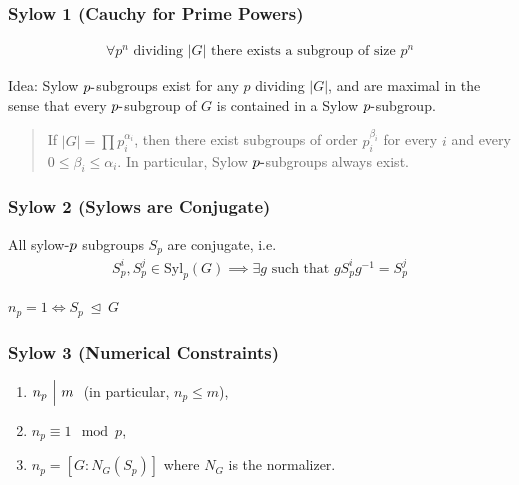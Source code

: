 \hypertarget{sylow-1-cauchy-for-prime-powers}{%
\subsubsection{Sylow 1 (Cauchy for Prime
Powers)}\label{sylow-1-cauchy-for-prime-powers}}

\begin{align*}
\forall p^n \text{ dividing } {\left\lvert {G} \right\rvert} \text{ there exists a subgroup of size } p^n
\end{align*}

Idea: Sylow \(p{\hbox{-}}\)subgroups exist for any \(p\) dividing
\({\left\lvert {G} \right\rvert}\), and are maximal in the sense that
every \(p{\hbox{-}}\)subgroup of \(G\) is contained in a Sylow
\(p{\hbox{-}}\)subgroup.

\begin{quote}
If \({\left\lvert {G} \right\rvert} = \prod p_i^{\alpha_i}\), then there
exist subgroups of order \(p_i^{\beta_i}\) for every \(i\) and every
\(0 \leq \beta_i \leq \alpha_i\). In particular, Sylow
\(p{\hbox{-}}\)subgroups always exist.
\end{quote}

\hypertarget{sylow-2-sylows-are-conjugate}{%
\subsubsection{Sylow 2 (Sylows are
Conjugate)}\label{sylow-2-sylows-are-conjugate}}

All sylow\({\hbox{-}}p\) subgroups \(S_p\) are conjugate, i.e.
\begin{align*}
S_p^i, S_p^j \in \mathrm{Syl}_p(G) \implies \exists g \text{ such that } g S_p^i g^{-1}= S_p^j
\end{align*}

\(n_p = 1 \iff S_p {~\trianglelefteq~}G\)

\hypertarget{sylow-3-numerical-constraints}{%
\subsubsection{Sylow 3 (Numerical
Constraints)}\label{sylow-3-numerical-constraints}}

\begin{enumerate}
\def\labelenumi{\arabic{enumi}.}
\item
  \(n_p {~\Bigm|~}m~\) (in particular, \(n_p \leq m\)),
\item
  \(n_p \equiv 1 \mod p\),
\item
  \(n_p = [G : N_G(S_p)]\) where \(N_G\) is the normalizer.
\end{enumerate}

